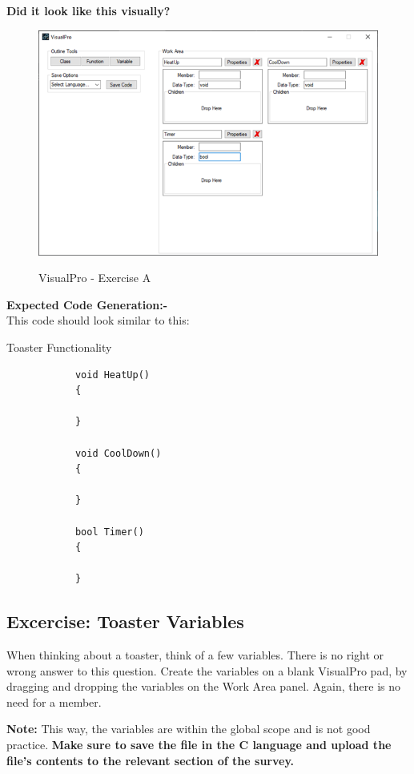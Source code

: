 \documentclass[10pt]{article}
\begin{document}
      \textbf{Did it look like this visually?}
        \begin{figure}[h]
          \centering
          {\includegraphics[scale=0.75]{Figures/Exercises/TutB-SecA-1.png}}
          \caption{VisualPro - Exercise A}
          \label{fig:vp-eA}
        \end{figure}

      \textbf{Expected Code Generation:-}\\
        This code should look similar to this:
        \begin{example}{Toaster Functionality}
          \begin{lstlisting}
            void HeatUp()
            {

            }

            void CoolDown()
            {

            }

            bool Timer()
            {

            }
          \end{lstlisting}
        \end{example}

    \subsection{Excercise: Toaster Variables}
        When thinking about a toaster, think of a few variables. There is no right or wrong answer to this question. Create the variables on a blank VisualPro pad, by dragging and dropping the variables on the Work Area panel. Again, there is no need for a member.

        \textbf{Note:} This way, the variables are within the global scope and is not good practice. \textbf{Make sure to save the file in the C language and upload the file's contents to the relevant section of the survey.}
\end{document}
